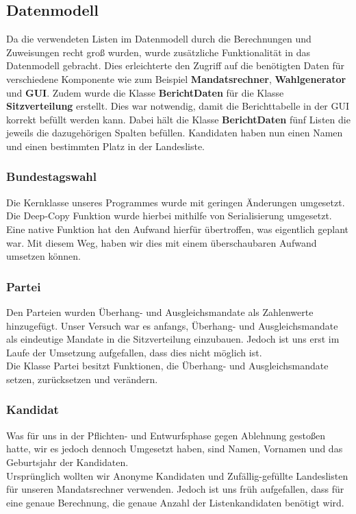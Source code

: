 \documentclass[12pt,a4paper,titlepage]{article}
\newcommand{\myma}{\fontfamily{pcr}\selectfont \textbf}
\begin{document}
\subsection{Datenmodell}
Da die verwendeten Listen im Datenmodell durch die Berechnungen und Zuweisungen recht groß wurden, wurde zusätzliche Funktionalität in das Datenmodell gebracht. Dies erleichterte den Zugriff auf die benötigten Daten für verschiedene Komponente wie zum Beispiel {\myma{Mandatsrechner}}, {\myma{Wahlgenerator}} und {\myma{GUI}}.
Zudem wurde die Klasse {\myma{BerichtDaten}} für die Klasse {\myma{Sitzverteilung}} erstellt. Dies war notwendig, damit die Berichttabelle in der GUI korrekt befüllt werden kann. Dabei hält die Klasse {\myma{BerichtDaten}} fünf Listen die jeweils die dazugehörigen Spalten befüllen. 
Kandidaten haben nun einen Namen und einen bestimmten Platz in der Landesliste.
\subsubsection{Bundestagswahl}
Die Kernklasse unseres Programmes wurde mit geringen Änderungen umgesetzt. Die Deep-Copy Funktion wurde hierbei mithilfe von Serialisierung umgesetzt. Eine native Funktion hat den Aufwand hierfür übertroffen, was eigentlich geplant war. Mit diesem Weg, haben wir dies mit einem überschaubaren Aufwand umsetzen können.

\subsubsection{Partei}
Den Parteien wurden Überhang- und Ausgleichsmandate als Zahlenwerte hinzugefügt. Unser Versuch war es anfangs, Überhang- und Ausgleichsmandate als eindeutige Mandate in die Sitzverteilung einzubauen. Jedoch ist uns erst im Laufe der Umsetzung aufgefallen, dass dies nicht möglich ist. \\
Die Klasse Partei besitzt Funktionen, die Überhang- und Ausgleichsmandate setzen, zurücksetzen und verändern.

\subsubsection{Kandidat}
Was für uns in der Pflichten- und Entwurfsphase gegen Ablehnung gestoßen hatte, wir es jedoch dennoch Umgesetzt haben, sind Namen, Vornamen und das Geburtsjahr der Kandidaten. \\
Ursprünglich wollten wir Anonyme Kandidaten und Zufällig-gefüllte Landeslisten für unseren Mandatsrechner verwenden. Jedoch ist uns früh aufgefallen, dass für eine genaue Berechnung, die genaue Anzahl der Listenkandidaten benötigt wird.
\end{document}
